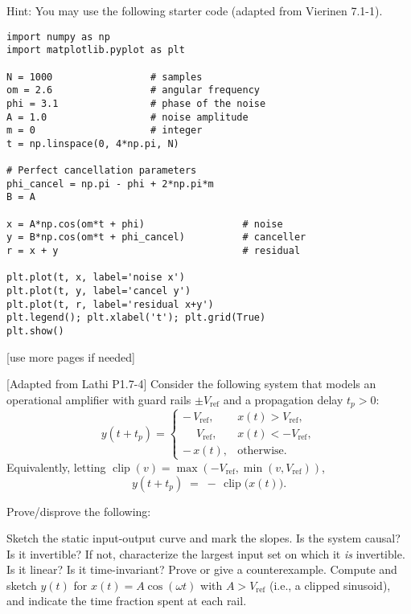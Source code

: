 \documentclass{ee102_pset}
\begin{document}
Hint: You may use the following starter code (adapted from Vierinen 7.1-1).

\begin{lstlisting}[style=py,caption={Starter code for Part (d)},label=lst:noise-cancel]
import numpy as np
import matplotlib.pyplot as plt

N = 1000                 # samples
om = 2.6                 # angular frequency
phi = 3.1                # phase of the noise
A = 1.0                  # noise amplitude
m = 0                    # integer
t = np.linspace(0, 4*np.pi, N)

# Perfect cancellation parameters
phi_cancel = np.pi - phi + 2*np.pi*m
B = A

x = A*np.cos(om*t + phi)                 # noise
y = B*np.cos(om*t + phi_cancel)          # canceller
r = x + y                                # residual

plt.plot(t, x, label='noise x')
plt.plot(t, y, label='cancel y')
plt.plot(t, r, label='residual x+y')
plt.legend(); plt.xlabel('t'); plt.grid(True)
plt.show()
\end{lstlisting}


\vspace*{\fill}
\begin{center}
[use more pages if needed]
\end{center}
 [Adapted from Lathi P1.7-4] Consider the following system that models an operational amplifier with guard rails $\pm V_{\text{ref}}$ and a propagation delay $t_p>0$:
\[
y(t+t_p)=
\begin{cases}
-\,V_{\text{ref}}, & x(t)> V_{\text{ref}},\\[2pt]
\phantom{-}V_{\text{ref}}, & x(t)<-V_{\text{ref}},\\[2pt]
-\,x(t), & \text{otherwise}.
\end{cases}
\]
Equivalently, letting $\operatorname{clip}(v)=\max(-V_{\text{ref}},\min(v,V_{\text{ref}}))$,
\[
y(t+t_p) \;=\; -\,\operatorname{clip}\big(x(t)\big).
\]

Prove/disprove the following:

\problempart{\textbf{[5 points]}} Sketch the static input-output curve and mark the slopes.
\problempart{\textbf{[5 points]}} Is the system causal?
\problempart{\textbf{[5 points]}} Is it invertible? If not, characterize the largest input set on which it \emph{is} invertible.
\problempart{\textbf{[5 points]}} Is it linear? 
\problempart{\textbf{[5 points]}} Is it time-invariant? Prove or give a counterexample.
\problempart{\textbf{[5 points]}} Compute and sketch $y(t)$ for $x(t)=A\cos(\omega t)$ with $A>V_{\text{ref}}$ (i.e., a clipped sinusoid), and indicate the time fraction spent at each rail.
\end{document}
